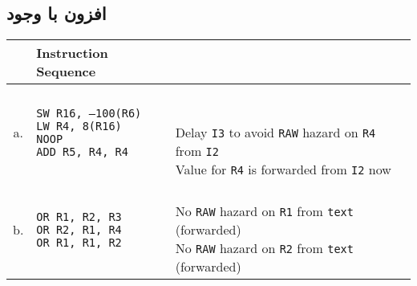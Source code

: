 \documentclass[11pt, dvipsnames, svgnames, x11names]{article}
\begin{document}
\subsection{افزون  با وجود }
\begin{latin}
\begin{table}[H]
\begin{center}
\begin{tabular}{|c|l|l|}
\hline
& Instruction Sequence & \\
\hline
a. &
\makecell[l]{
\texttt{SW R16, –100(R6)} \\
\texttt{LW  R4, 8(R16)} \\
\texttt{NOOP} \\
\texttt{ADD R5, R4, R4}}&
\makecell[l]{ \\ \\
Delay \texttt{I3} to avoid \texttt{RAW} hazard on \texttt{R4} from \texttt{I2} \\
Value for \texttt{R4} is forwarded from \texttt{I2} now
} \\
\hline
b. &
\makecell[l]{
\texttt{OR R1, R2, R3} \\
\texttt{OR R2, R1, R4} \\
\texttt{OR R1, R1, R2} \\
} &
\makecell[l]{ \\
No \texttt{RAW} hazard on \texttt{R1} from \texttt{text} (forwarded) \\
No \texttt{RAW} hazard on \texttt{R2} from \texttt{text} (forwarded) \\}
\\
\hline
\end{tabular}
\end{center}
\end{table}
\end{latin}
\newpage
\end{document}
